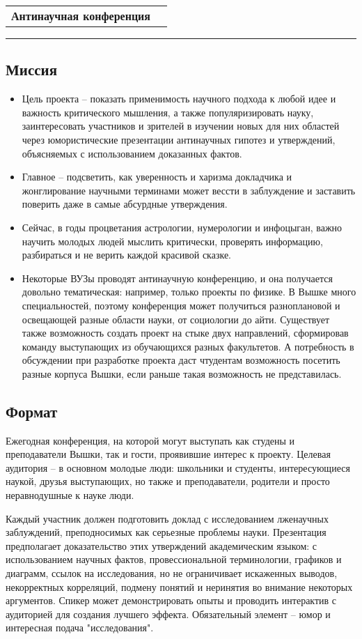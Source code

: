 \documentclass[12pt]{article}
\begin{document}
\begin{tabularx}{\textwidth}{Xr}
{\Large \textbf{Антинаучная конференция}} &  \\
\end{tabularx}
\noindent\rule{\textwidth}{0.4pt}
\subsection*{Миссия}
\begin{itemize}
    \item Цель проекта -- показать применимость научного подхода к любой идее и важность критического мышления, а также популяризировать науку, заинтересовать участников и зрителей в изучении новых для них областей через юмористические презентации антинаучных гипотез и утверждений, объясняемых с использованием доказанных фактов.
    \item Главное -- подсветить, как уверенность и харизма докладчика и жонглирование научными терминами может вессти в заблуждение и заставить поверить даже в самые абсурдные утверждения.
    \item Сейчас, в годы процветания астрологии, нумерологии и инфоцыган, важно научить молодых людей мыслить критически, проверять информацию, разбираться и не верить каждой красивой сказке.
    \item Некоторые ВУЗы проводят антинаучную конференцию, и она получается довольно тематическая: например, только проекты по физике. В Вышке много специальностей, поэтому конференция может получиться разноплановой и освещающей разные области науки, от социологии до айти. Существует также возможность создать проект на стыке двух направлений, сформировав команду выступающих из обучающихся разных факультетов. А потребность в обсуждении при разработке проекта даст чтудентам возможность посетить разные корпуса Вышки, если раньше такая возможность не представилась.
\end{itemize} 
\subsection*{Формат}
Ежегодная конференция, на которой могут выступать как студены и преподаватели Вышки, так и гости, проявившие интерес к проекту. Целевая аудитория -- в основном молодые люди: школьники и студенты, интересующиеся наукой, друзья выступающих, но также и преподаватели, родители и просто неравнодушные к науке люди.

Каждый участник должен подготовить доклад с исследованием лженаучных заблуждений, преподносимых как серьезные проблемы науки. Презентация предполагает доказательство этих утверждений академическим языком: с использованием научных фактов, провессиональной терминологии, графиков и диаграмм, ссылок на исследования, но не ограничивает искаженных выводов, некорректных корреляций, подмену понятий и неринятия во внимание некоторых аргументов. Спикер может демонстрировать опыты и проводить интерактив с аудиторией для создания лучшего эффекта. Обязательный элемент -- юмор и интересная подача "исследования".
\end{document}
